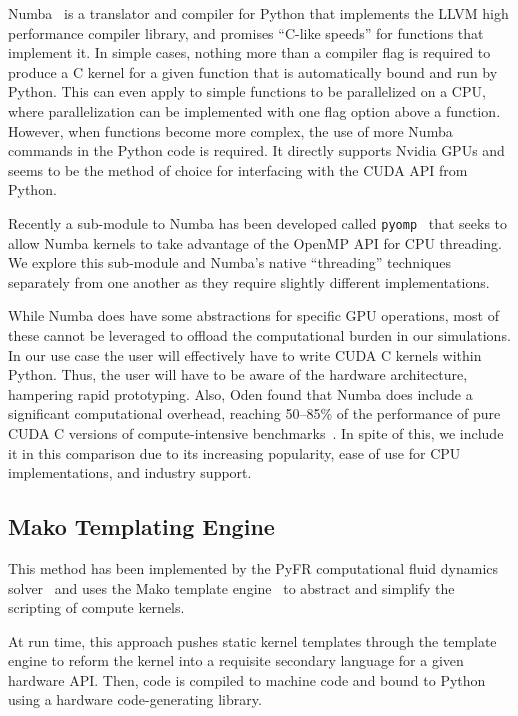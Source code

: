 Numba~\cite{lam_numba_2015} is a translator and compiler for Python that implements the LLVM high performance compiler library, and promises ``C-like speeds'' for functions that implement it.
In simple cases, nothing more than a compiler flag is required to produce a C kernel for a given function that is automatically bound and run by Python.
This can even apply to simple functions to be parallelized on a CPU, where parallelization can be implemented with one flag option above a function.
However, when functions become more complex, the use of more Numba commands in the Python code is required.
It directly supports Nvidia GPUs and seems to be the method of choice for interfacing with the CUDA API from Python.

Recently a sub-module to Numba has been developed called \texttt{pyomp}~\cite{Mattson2021PyOMP:Python} that seeks to allow Numba kernels to take advantage of the OpenMP API for CPU threading.
We explore this sub-module and Numba's native ``threading'' techniques separately from one another as they require slightly different implementations.

While Numba does have some abstractions for specific GPU operations, most of these cannot be leveraged to offload the computational burden in our simulations.
In our use case the user will effectively have to write CUDA C kernels within Python.
Thus, the user will have to be aware of the hardware architecture, hampering rapid prototyping.
Also, Oden found that Numba does include a significant computational overhead, reaching 50--85\% of the performance of pure CUDA C versions of compute-intensive benchmarks~\cite{Oden2020LessonsGPU-Computing}.
In spite of this, we include it in this comparison due to its increasing popularity, ease of use for CPU implementations, and industry support.
 
\subsection{Mako Templating Engine}

This method has been implemented by the PyFR computational fluid dynamics solver~\cite{Witherden2014PyFR:Approach} and uses the Mako template engine~\cite{Bayer2013Mako:Python} to abstract and simplify the scripting of compute kernels.

At run time, this approach pushes static kernel templates through the template engine to reform the kernel into a requisite secondary language for a given hardware API. 
Then, code is compiled to machine code and bound to Python using a hardware code-generating library.

